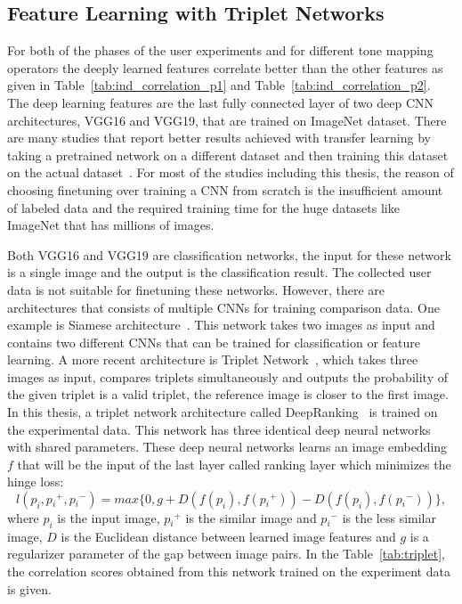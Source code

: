 \subsection{Feature Learning with Triplet Networks}
For both of the phases of the user experiments and for different tone mapping operators the deeply learned features correlate better than the other features as given in Table~\ref{tab:ind_correlation_p1} and Table~\ref{tab:ind_correlation_p2}. The deep learning features are the last fully connected layer of two deep CNN architectures, VGG16 and VGG19, that are trained on ImageNet dataset. There are many studies that report better results achieved with transfer learning by taking a pretrained network on a different dataset and then training this dataset on the actual dataset~\cite{ouyang2016factors}. For most of the studies including this thesis, the reason of choosing finetuning over training a CNN from scratch is the insufficient amount of labeled data and the required training time for the huge datasets like ImageNet that has millions of images.

Both VGG16 and VGG19 are classification networks, the input for these network is a single image and the output is the classification result. The collected user data is not suitable for finetuning these networks. However, there are architectures that consists of multiple CNNs for training comparison data. One example is Siamese architecture~\cite{hadsell2006dimensionality}. This network takes two images as input and contains two different CNNs that can be trained for classification or feature learning. A more recent architecture is Triplet Network~\cite{vo2016localizing}, which takes three images as input, compares triplets simultaneously and outputs the probability of the given triplet is a valid triplet, the reference image is closer to the first image. In this thesis, a triplet network architecture called DeepRanking~\cite{wang2014learning} is trained on the experimental data. This network has three identical deep neural networks with shared parameters. These deep neural networks learns an image embedding $f$ that will be the input of the last layer called ranking layer which minimizes the hinge loss:
\begin{equation}
    l(p_i, p{_i}{^+}, p{_i}{^-}) = max \{0, g + D(f(p_i), f(p{_i}{^+})) - D(f(p_i), f(p{_i}{^-}))\},
\end{equation}
where $p_i$ is the input image, $p{_i}{^+}$ is the similar image and $p{_i}{^-}$ is the less similar image, $D$ is the Euclidean distance between learned image features and $g$ is a regularizer parameter of the gap between image pairs. In the Table~\ref{tab:triplet}, the correlation scores obtained from this network trained on the experiment data is given.

